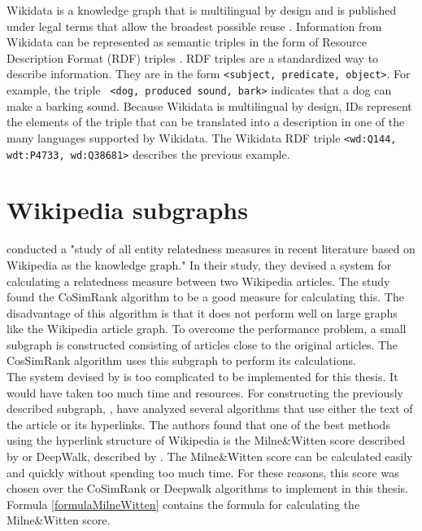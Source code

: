 Wikidata is a knowledge graph that is multilingual by design and is published under legal terms that allow the broadest possible reuse \citep{vrandevcic2014Wikidata}. Information from Wikidata can be represented as semantic triples in the form of Resource Description Format (RDF) triples \citep{erxleben}. RDF triples are a standardized way to describe information. They are in the form \texttt{<subject, predicate, object>}. For example, the triple \texttt{ <dog, produced sound, bark>} indicates that a dog can make a barking sound. Because Wikidata is multilingual by design, IDs represent the elements of the triple that can be translated into a description in one of the many languages supported by Wikidata. The Wikidata RDF triple \texttt{<wd:Q144, wdt:P4733, wd:Q38681>} describes the previous example.\\ 


\section{Wikipedia subgraphs}
\label{secWikipediaSubgraphs}
\citet{Ponza2017} conducted a "study of all entity relatedness measures in recent literature based on Wikipedia as the knowledge graph." In their study, they devised a system for calculating a relatedness measure between two Wikipedia articles. The study found the  CoSimRank algorithm \citep{cosimrank} to be a good measure for calculating this. The disadvantage of this algorithm is that it does not perform well on large graphs like the Wikipedia article graph. To overcome the performance problem, a small subgraph is constructed consisting of articles close to the original articles. The CosSimRank algorithm uses this subgraph to perform its calculations. \\

The system devised by \citet{Ponza2017} is too complicated to be implemented for this thesis. It would have taken too much time and resources. For constructing the previously described subgraph, \citet{Ponza2017}, have analyzed several algorithms that use either the text of the article or its hyperlinks. The authors found that one of the best methods using the hyperlink structure of Wikipedia is the Milne\&Witten score described by \citet{Witten2008} or DeepWalk, described by \citet{deepwalk}. The Milne\&Witten score can be calculated easily and quickly without spending too much time. For these reasons, this score was chosen over the CoSimRank or Deepwalk algorithms to implement in this thesis. Formula \ref{formulaMilneWitten} contains the formula for calculating the Milne\&Witten score.\\

